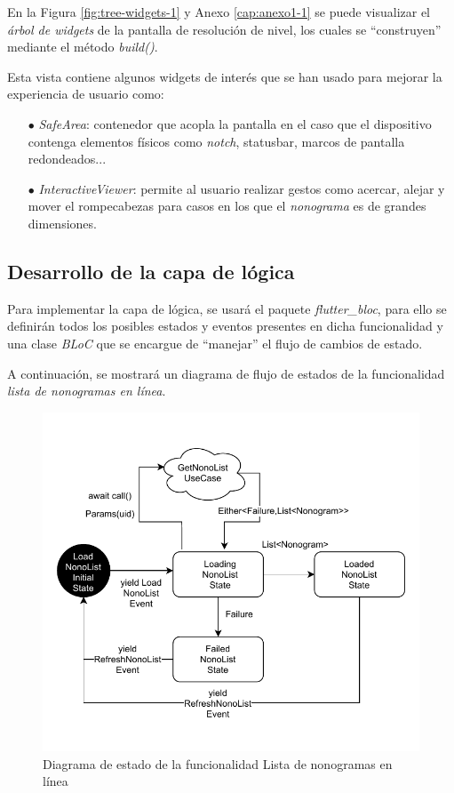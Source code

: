 En la Figura \ref{fig:tree-widgets-1} y Anexo \ref{cap:anexo1-1} se puede visualizar el \textit{árbol de widgets} de la pantalla de resolución de nivel, los cuales
se ``construyen'' mediante el método \textit{build()}.

Esta vista contiene algunos widgets de interés que se han usado para mejorar la experiencia de usuario como:
\begin{itemize}
  \item[$\bullet$] \textit{SafeArea}: contenedor que acopla la pantalla en el caso que el dispositivo contenga elementos físicos como \textit{notch}, 
  statusbar, marcos de pantalla redondeados...
  \item[$\bullet$] \textit{InteractiveViewer}: permite al usuario realizar gestos como acercar, alejar y mover el rompecabezas 
  para casos en los que el \textit{nonograma} es de grandes dimensiones. 
\end{itemize}

\subsection{Desarrollo de la capa de lógica}
Para implementar la capa de lógica, se usará el paquete \textit{flutter\_bloc}, para ello se definirán todos los 
posibles estados y eventos presentes en dicha funcionalidad y una clase \textit{BLoC} que se encargue de 
``manejar'' el flujo de cambios de estado.

A continuación, se mostrará un diagrama de flujo de estados de la funcionalidad \textit{lista de nonogramas en línea}.

\begin{figure}[H]
  \centering
  \includegraphics[scale=0.83]{images/statesNonoList.pdf}
  \caption{Diagrama de estado de la funcionalidad Lista de nonogramas en línea}
  \label{fig:nonolist-states}
\end{figure}

